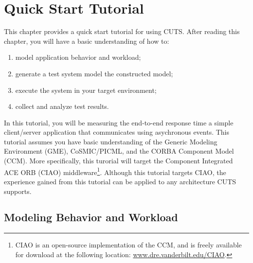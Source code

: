 
\chapter{Quick Start Tutorial}

This chapter provides a quick start tutorial for using CUTS. After reading this
chapter, you will have a basic understanding of how to:
\begin{enumerate}
  \item model application behavior and workload;

  \item generate a test system model the constructed model;

  \item execute the system in your target environment;

  \item collect and analyze test results.
\end{enumerate}
In this tutorial, you will be measuring the end-to-end response time a simple
client/\-server application that communicates using asychronous events. This
tutorial assumes you have basic understanding of the Generic Modeling 
Environment (GME), CoSMIC/\-PICML, and the CORBA Component Model (CCM). More specifically,
this turorial will target the Component Integrated ACE ORB (CIAO) 
middleware\footnote{CIAO is an open-source implementation of the CCM, and is freely 
available for download at the following location: \url{www.dre.vanderbilt.edu/CIAO}.}.
Although this tutorial targets CIAO, the experience gained from
this tutorial can be applied to any architecture CUTS supports.

\section{Modeling Behavior and Workload}
\label{sec:quickstart-modeling}

